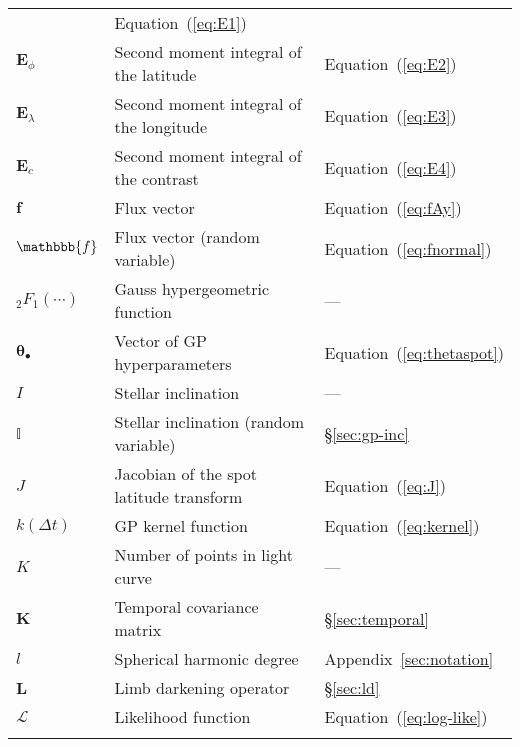 \begin{center}
\begin{longtable}{W{c}{1cm} W{l}{9cm} W{l}{2cm}}
         & Equation~(\ref{eq:E1})
        \\
        $\mathbf{E}_\phi$
         & Second moment integral of the latitude
         & Equation~(\ref{eq:E2})
        \\
        $\mathbf{E}_\lambda$
         & Second moment integral of the longitude
         & Equation~(\ref{eq:E3})
        \\
        $\mathbf{E}_c$
         & Second moment integral of the contrast
         & Equation~(\ref{eq:E4})
        \\
        $\mathbf{f}$
         & Flux vector
         & Equation~(\ref{eq:fAy})
        \\
        $\mathbbb{f}$
         & Flux vector (random variable)
         & Equation~(\ref{eq:fnormal})
        \\
        ${_2}F_1(\cdots)$
         & Gauss hypergeometric function
         & ---
        \\
        $\pmb{\theta}_\bullet$
         & Vector of GP hyperparameters
         & Equation~(\ref{eq:thetaspot})
        \\
        $I$
         & Stellar inclination
         & ---
        \\
        $\mathbb{I}$
         & Stellar inclination (random variable)
         & \S\ref{sec:gp-inc}
        \\
        $J$
         & Jacobian of the spot latitude transform
         & Equation~(\ref{eq:J})
        \\
        $k(\Delta t)$
         & GP kernel function
         & Equation~(\ref{eq:kernel})
        \\
        $K$
         & Number of points in light curve
         & ---
        \\
        $\mathbf{K}$
         & Temporal covariance matrix
         & \S\ref{sec:temporal}
        \\
        $l$
         & Spherical harmonic degree
         & Appendix~\ref{sec:notation}
        \\
        $\mathbf{L}$
         & Limb darkening operator
         & \S\ref{sec:ld}
        \\
        $\mathcal{L}$
         & Likelihood function
         & Equation~(\ref{eq:log-like})
        \\
        \pagebreak %

\end{longtable}
\end{center}
